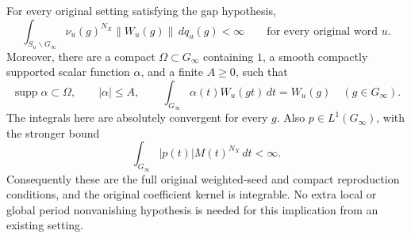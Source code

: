\begin{theorem}\label{actual-seed-decay-theorem}
For every original setting satisfying the gap hypothesis,
\begin{equation}\label{actual-seed-weighted}
 \int_{S_u\backslash G_\infty}\nu_u(g)^{N_X}
                       \|W_u(g)\|\,dq_u(g)<\infty
 \qquad\text{for every original word }u.
\end{equation}
Moreover, there are a compact $\Omega\subset G_\infty$ containing
$1$, a smooth compactly supported scalar function $\alpha$, and
a finite $A\ge0$, such that
\[
 \operatorname{supp}\alpha\subset\Omega,\qquad
 |\alpha|\le A,\qquad
 \int_{G_\infty}\alpha(t)W_u(gt)\,dt=W_u(g)
 \quad(g\in G_\infty).
\]
The integrals here are absolutely convergent for every $g$.
Also $p\in L^1(G_\infty)$, with the stronger bound
\begin{equation}\label{actual-seed-coefficient-weight}
             \int_{G_\infty}|p(t)|M(t)^{N_X}\,dt<\infty.
\end{equation}
Consequently these are the full original weighted-seed and compact
reproduction conditions, and the original coefficient kernel is
integrable.  No extra local or global period nonvanishing hypothesis
is needed for this implication from an existing setting.
\end{theorem}

